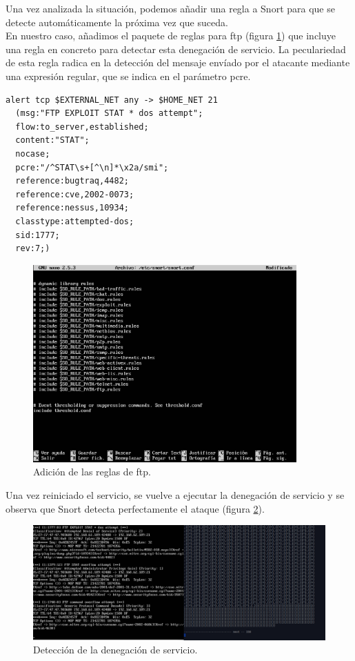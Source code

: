 \documentclass[a4,12pt,onecolum]{article}
\begin{document}
Una vez analizada la situación, podemos añadir una regla a Snort para que se detecte automáticamente la próxima vez que suceda. \\

En nuestro caso, añadimos el paquete de reglas para ftp (figura \ref{fig:snort11}) que incluye una regla en concreto para detectar esta denegación de servicio. La peculariedad de esta regla radica en la detección del mensaje envíado por el atacante mediante una expresión regular, que se indica en el parámetro pcre.

\begin{verbatim}
alert tcp $EXTERNAL_NET any -> $HOME_NET 21
  (msg:"FTP EXPLOIT STAT * dos attempt";
  flow:to_server,established;
  content:"STAT";
  nocase;
  pcre:"/^STAT\s+[^\n]*\x2a/smi";
  reference:bugtraq,4482;
  reference:cve,2002-0073;
  reference:nessus,10934;
  classtype:attempted-dos;
  sid:1777;
  rev:7;)
\end{verbatim}

\begin{figure}[htbp]
\centering
\includegraphics[width=0.9\textwidth]{./images/SnortFtp.png}
\caption{Adición de las reglas de ftp.}
\label{fig:snort11}
\end{figure}

Una vez reiniciado el servicio, se vuelve a ejecutar la denegación de servicio y se observa que Snort detecta perfectamente el ataque (figura \ref{fig:snort12}).

\begin{figure}[htbp]
\centering
\includegraphics[width=1.0\textwidth]{./images/Snortftpdos.png}
\caption{Detección de la denegación de servicio.}
\label{fig:snort12}
\end{figure}
\end{document}
